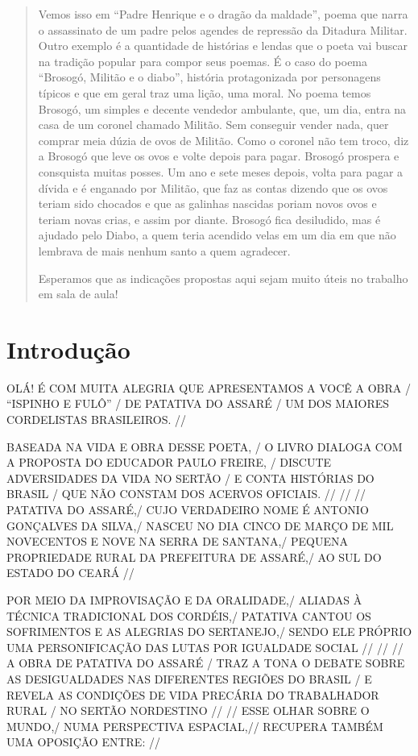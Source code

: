 \documentclass[12pt]{extarticle}
\begin{document}
\begin{abstract}
Vemos isso em “Padre Henrique e o dragão da maldade”, poema que narra o assassinato 
de um padre pelos agendes de repressão da Ditadura Militar. Outro exemplo é a 
quantidade de histórias e lendas que o poeta vai buscar na tradição popular 
para compor seus poemas. É o caso do poema “Brosogó, Militão e o diabo”, história 
protagonizada por personagens típicos e que em geral traz uma lição, uma moral. 
No poema temos Brosogó, um simples e decente vendedor ambulante, que, um dia, entra 
na casa de um coronel chamado Militão. Sem conseguir vender nada, quer comprar meia 
dúzia de ovos de Militão. Como o coronel não tem troco, diz a Brosogó que leve os ovos 
e volte depois para pagar. Brosogó prospera e consquista muitas posses. Um ano e 
sete meses depois, volta para pagar a dívida e é enganado por Militão, que faz as 
contas dizendo que os ovos teriam sido chocados e que as galinhas nascidas poriam 
novos ovos e teriam novas crias, e assim por diante. Brosogó fica desiludido, mas 
é ajudado pelo Diabo, a quem teria acendido velas em um dia em que não lembrava de 
mais nenhum santo a quem agradecer.

Esperamos que as indicações propostas aqui sejam muito úteis no trabalho em
sala de aula!



\end{abstract}

\tableofcontents


\section{Introdução}

OLÁ! É COM MUITA ALEGRIA QUE APRESENTAMOS A VOCÊ A OBRA / “ISPINHO E FULÔ” / DE PATATIVA DO ASSARÉ / UM DOS MAIORES CORDELISTAS BRASILEIROS. // 
 
BASEADA NA VIDA E OBRA DESSE POETA, / O LIVRO DIALOGA COM A PROPOSTA DO EDUCADOR PAULO FREIRE, / DISCUTE ADVERSIDADES DA VIDA NO SERTÃO / E CONTA HISTÓRIAS DO BRASIL / QUE NÃO CONSTAM DOS ACERVOS OFICIAIS. //
 //
//
PATATIVA DO ASSARÉ,/ CUJO VERDADEIRO NOME É ANTONIO GONÇALVES DA SILVA,/ NASCEU NO DIA CINCO DE MARÇO DE MIL NOVECENTOS E NOVE NA SERRA DE SANTANA,/ PEQUENA PROPRIEDADE RURAL DA PREFEITURA DE ASSARÉ,/ AO SUL DO ESTADO DO CEARÁ //

POR MEIO DA IMPROVISAÇÃO E DA ORALIDADE,/ ALIADAS À TÉCNICA TRADICIONAL DOS CORDÉIS,/ PATATIVA CANTOU OS SOFRIMENTOS E AS ALEGRIAS DO SERTANEJO,/ SENDO ELE PRÓPRIO UMA PERSONIFICAÇÃO DAS LUTAS POR IGUALDADE SOCIAL //
//
//
A OBRA DE PATATIVA DO ASSARÉ / TRAZ A TONA O DEBATE SOBRE AS DESIGUALDADES NAS DIFERENTES REGIÕES DO BRASIL / E REVELA AS CONDIÇÕES DE VIDA PRECÁRIA DO TRABALHADOR RURAL / NO SERTÃO NORDESTINO //
//
ESSE OLHAR SOBRE O MUNDO,/ NUMA PERSPECTIVA ESPACIAL,// RECUPERA TAMBÉM UMA OPOSIÇÃO ENTRE: //
\end{document}
